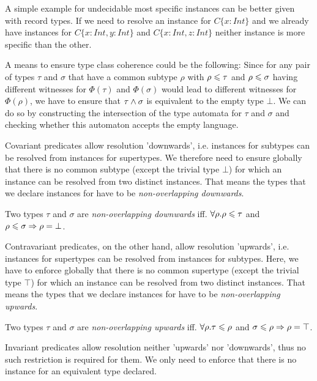 A simple example for undecidable most specific instances can be better given with record types.
If we need to resolve an instance for $C \{x : Int\}$ and we already have instances for $C \{x : Int, y : Int\}$ and $C \{x : Int, z : Int\}$ neither instance is more specific than the other.


A means to ensure type class coherence could be the following:
Since for any pair of types $\tau$ and $\sigma$ that have a common subtype $\rho$ with $\rho \leqslant \tau$ and $\rho \leqslant \sigma$ having different witnesses for $\Phi(\tau)$ and $\Phi(\sigma)$ would lead to different witnesses for $\Phi(\rho)$,
we have to ensure that $\tau \wedge \sigma$ is equivalent to the empty type $\bot$.
We can do so by constructing the intersection of the type automata for $\tau$ and $\sigma$ and checking whether this automaton accepts the empty language.


Covariant predicates allow resolution 'downwards', i.e. instances for subtypes can be resolved from instances for supertypes.
We therefore need to ensure globally that there is no common subtype (except the trivial type $\bot$) for which an instance can be resolved from two distinct instances.
That means the types that we declare instances for have to be \emph{non-overlapping downwards}.

\begin{definition}
  Two types $\tau$ and $\sigma$ are \emph{non-overlapping downwards} iff. $\forall\rho. \rho \leqslant \tau$ and $\rho \leqslant \sigma \Rightarrow \rho = \bot$.
\end{definition}

Contravariant predicates, on the other hand, allow resolution 'upwards', i.e. instances for supertypes can be resolved from instances for subtypes.
Here, we have to enforce globally that there is no common supertype (except the trivial type $\top$) for which an instance can be resolved from two distinct instances.
That means the types that we declare instances for have to be \emph{non-overlapping upwards}.

\begin{definition}
  Two types $\tau$ and $\sigma$ are \emph{non-overlapping upwards} iff. $\forall\rho. \tau \leqslant \rho$ and $\sigma \leqslant \rho \Rightarrow \rho = \top$.
\end{definition}

Invariant predicates allow resolution neither 'upwards' nor 'downwards', thus no such restriction is required for them.
We only need to enforce that there is no instance for an equivalent type declared.